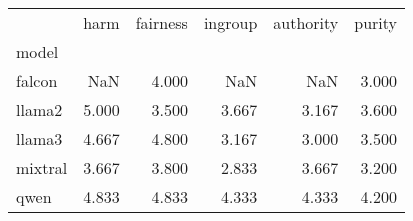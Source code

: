 \begin{tabular}{lrrrrr}
\toprule
 & harm & fairness & ingroup & authority & purity \\
model &  &  &  &  &  \\
\midrule
falcon & NaN & 4.000 & NaN & NaN & 3.000 \\
llama2 & 5.000 & 3.500 & 3.667 & 3.167 & 3.600 \\
llama3 & 4.667 & 4.800 & 3.167 & 3.000 & 3.500 \\
mixtral & 3.667 & 3.800 & 2.833 & 3.667 & 3.200 \\
qwen & 4.833 & 4.833 & 4.333 & 4.333 & 4.200 \\
\bottomrule
\end{tabular}

